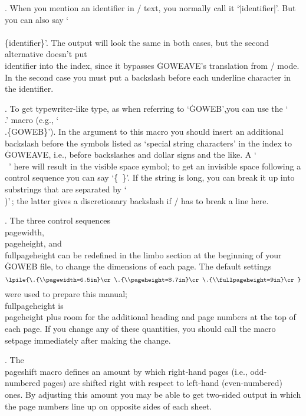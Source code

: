 . When you mention an identifier in \TEX/ text, you normally call
it `\.{|identifier|}'. But you can also say `\.{\\\\\{identifier\}}'. The
output will look the same in both cases, but the second alternative
doesn't put \\{identifier} into the index, since
it bypasses \.{GOWEAVE}'s translation from \GO/ mode. In the second
case you must put a backslash before each underline character
in the identifier.

. To get typewriter-like type, as when referring to `\.{GOWEB}',you
can use the `\.{\\.}' macro (e.g., `\.{\\.\{GOWEB\}}'). In the argument to
this macro you should insert an additional backslash before the symbols
listed as `special string characters' in the index to \.{GOWEAVE}, i.e.,
before backslashes and dollar signs and the like.
A `\.{\\\ }' here will result in the visible space symbol; to get an
invisible space following a control sequence you can say `\.{\{\ \}}'.
If the string is long, you can break it up into substrings that
are separated by `\.{\\)}'\,; the latter gives a discretionary backslash
if \TEX/ has to break a line here.

. The three control sequences \.{\\pagewidth}, \.{\\pageheight},
and \.{\\fullpageheight} can be redefined in the limbo section at the
beginning of your \.{GOWEB} file, to change the dimensions of each page.
The default settings
$$\lpile{\.{\\pagewidth=6.5in}\cr
  \.{\\pageheight=8.7in}\cr
  \.{\\fullpageheight=9in}\cr}$$
were used to prepare this manual; \.{\\fullpageheight} is
\.{\\pageheight} plus room for the additional heading and page numbers at
the top of each page. If you change any of these quantities, you should
call the macro \.{\\setpage} immediately after making the change.

. The \.{\\pageshift} macro defines an amount by which right-hand
pages (i.e., odd-numbered pages) are shifted right with respect to
left-hand (even-numbered) ones. By adjusting this amount you may be
able to get two-sided output in which the page numbers line up on
opposite sides of each sheet.

